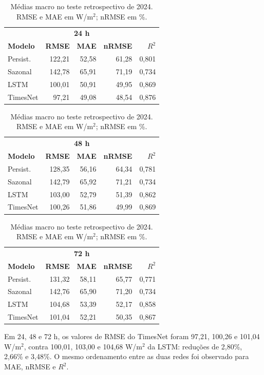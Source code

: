 \documentclass[10pt,conference,a4paper]{IEEEtran}
\begin{document}
\begin{table}[!t]
\centering
\caption{Médias macro no teste retrospectivo de 2024. RMSE e MAE em W/m$^2$;
nRMSE em \%.}
\label{tab:metricas_medias}
\scriptsize
\setlength{\tabcolsep}{2.0pt}
\renewcommand{\arraystretch}{0.96}
\begin{tabular}{lrrrr}
\toprule
\multicolumn{5}{c}{\textbf{24 h}} \\
\textbf{Modelo} & \textbf{RMSE} & \textbf{MAE} & \textbf{nRMSE} & \textbf{$R^2$} \\
\midrule
Persist. & 122,21 & 52,58 & 61,28 & 0,801 \\
Sazonal & 142,78 & 65,91 & 71,19 & 0,734 \\
LSTM & 100,01 & 50,91 & 49,95 & 0,869 \\
TimesNet & 97,21 & 49,08 & 48,54 & 0,876 \\
\bottomrule
\end{tabular}
\hfill
\begin{tabular}{lrrrr}
\toprule
\multicolumn{5}{c}{\textbf{48 h}} \\
\textbf{Modelo} & \textbf{RMSE} & \textbf{MAE} & \textbf{nRMSE} & \textbf{$R^2$} \\
\midrule
Persist. & 128,35 & 56,16 & 64,34 & 0,781 \\
Sazonal & 142,79 & 65,92 & 71,21 & 0,734 \\
LSTM & 103,00 & 52,79 & 51,39 & 0,862 \\
TimesNet & 100,26 & 51,86 & 49,99 & 0,869 \\
\bottomrule
\end{tabular}
\hfill
\begin{tabular}{lrrrr}
\toprule
\multicolumn{5}{c}{\textbf{72 h}} \\
\textbf{Modelo} & \textbf{RMSE} & \textbf{MAE} & \textbf{nRMSE} & \textbf{$R^2$} \\
\midrule
Persist. & 131,32 & 58,11 & 65,77 & 0,771 \\
Sazonal & 142,76 & 65,90 & 71,20 & 0,734 \\
LSTM & 104,68 & 53,39 & 52,17 & 0,858 \\
TimesNet & 101,04 & 52,21 & 50,35 & 0,867 \\
\bottomrule
\end{tabular}
\end{table}

Em 24, 48 e 72 h, os valores de RMSE do TimesNet foram 97,21, 100,26 e 101,04
W/m$^2$, contra 100,01, 103,00 e 104,68 W/m$^2$ da LSTM: reduções de 2,80\%,
2,66\% e 3,48\%. O mesmo ordenamento entre as duas redes foi observado para
MAE, nRMSE e $R^2$.
\end{document}
